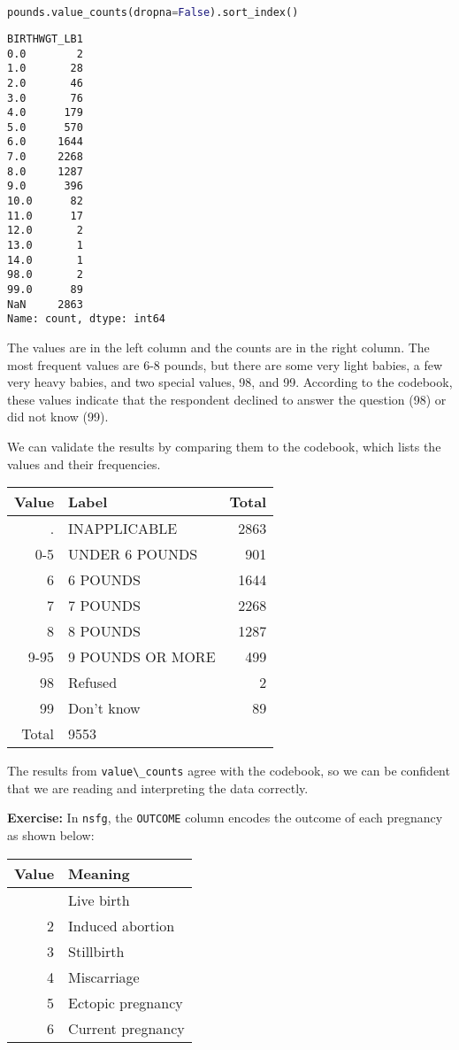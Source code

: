 \begin{lstlisting}[language=Python,style=source]
pounds.value_counts(dropna=False).sort_index()
\end{lstlisting}

\begin{lstlisting}[style=output]
BIRTHWGT_LB1
0.0        2
1.0       28
2.0       46
3.0       76
4.0      179
5.0      570
6.0     1644
7.0     2268
8.0     1287
9.0      396
10.0      82
11.0      17
12.0       2
13.0       1
14.0       1
98.0       2
99.0      89
NaN     2863
Name: count, dtype: int64
\end{lstlisting}

The values are in the left column and the counts are in the right
column. The most frequent values are 6-8 pounds, but there are some very
light babies, a few very heavy babies, and two special values, 98, and
99. According to the codebook, these values indicate that the respondent
declined to answer the question (98) or did not know (99).

\pagebreak

We can validate the results by comparing them to the codebook, which
lists the values and their frequencies.

\begin{longtable}[]{rlr}
\toprule
Value & Label & Total \\
\midrule
\endhead
\bottomrule
\endlastfoot
. & INAPPLICABLE & 2863 \\
0-5 & UNDER 6 POUNDS & 901 \\
6 & 6 POUNDS & 1644 \\
7 & 7 POUNDS & 2268 \\
8 & 8 POUNDS & 1287 \\
9-95 & 9 POUNDS OR MORE & 499 \\
98 & Refused & 2 \\
99 & Don't know & 89 \\
Total & 9553 & \\
\end{longtable}

The results from \passthrough{\lstinline!value\_counts!} agree with the
codebook, so we can be confident that we are reading and interpreting
the data correctly.

\textbf{Exercise:} In \passthrough{\lstinline!nsfg!}, the
\passthrough{\lstinline!OUTCOME!} column encodes the outcome of each
pregnancy as shown below:

\begin{longtable}[]{rl}
\toprule
Value & Meaning \\
\midrule
\endhead
\bottomrule
\endlastfoot
1 & Live birth \\
2 & Induced abortion \\
3 & Stillbirth \\
4 & Miscarriage \\
5 & Ectopic pregnancy \\
6 & Current pregnancy \\
\end{longtable}

